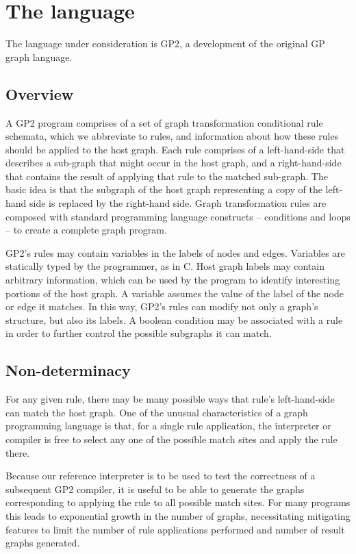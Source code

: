 
\section{The language}
\label{sec:gp2language}

The language under consideration is GP2\cite{plump2012design}, a development of the original GP graph language\cite{plump2009graph}.


\subsection{Overview}

A GP2 program comprises of a set of graph transformation conditional rule schemata, which we abbreviate to rules, and information about how these rules should be applied to the host graph. Each rule comprises of a left-hand-side that describes a sub-graph that might occur in the host graph, and a right-hand-side that contains the result of applying that rule to the matched sub-graph. The basic idea is that the subgraph of the host graph representing a copy of the left-hand side is replaced by the right-hand side. Graph transformation rules are composed with standard programming language constructs -- conditions and loops -- to create a complete graph program.


GP2’s rules may contain variables in the labels of nodes and edges. Variables are statically typed by the programmer, as in C. Host graph labels may contain arbitrary information, which can be used by the program to identify interesting portions of the host graph. A variable assumes the value of the label of the node or edge it matches. In this way, GP2’s rules can modify not only a graph’s structure, but also its labels. A boolean condition may be associated with a rule in order to further control the possible subgraphs it can match.


\subsection{Non-determinacy}


For any given rule, there may be many possible ways that rule’s left-hand-side can match the host graph. One of the unusual characteristics of a graph programming language is that, for a single rule application, the interpreter or compiler is free to select any one of the possible match sites and apply the rule there.


Because our reference interpreter is to be used to test the correctness of a subsequent GP2 compiler, it is useful to be able to generate the graphs corresponding to applying the rule to all possible match sites. For many programs this leads to exponential growth in the number of graphs, necessitating mitigating features to limit the number of rule applications performed and number of result graphs generated.

